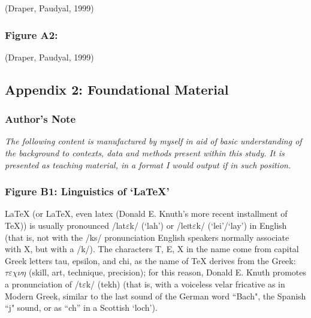 \documentclass[11pt, english]{article}
\begin{document}
			\begin{center}
			\end{center}

			(Draper, Paudyal, 1999)

		\subsubsection*{Figure A2:}

			\begin{center}
                        \end{center}

			(Draper, Paudyal, 1999)


	\subsection*{Appendix 2: Foundational Material}

		\subsubsection*{Author's Note}

			\textit{The following content is manufactured by myself in aid of basic understanding of the background to contexts, data and methods present within this study. It is presented as teaching material, in a format I would output if in such position.}
		\subsubsection*{Figure B1: Linguistics of `{\LaTeX}'}

		{\LaTeX} (or LaTeX, even latex (Donald E. Knuth's more recent installment of {\TeX})) is usually pronounced /la\textlengthmark t$\varepsilon$k/ (`lah') or /le\textsc{i}t$\varepsilon$k/ (`lei'/`lay') in English (that is, not with the /ks/ pronunciation English speakers normally associate with X, but with a /k/). The characters T, E, X in the name come from capital Greek letters tau, epsilon, and chi, as the name of {\TeX} derives from the Greek: $\tau\varepsilon\chi\nu\eta$ (skill, art, technique, precision); for this reason, Donald E. Knuth promotes a pronunciation of /t$\varepsilon$k/ (tekh) (that is, with a voiceless velar fricative as in Modern Greek, similar to the last sound of the German word ``Bach", the Spanish ``j" sound, or as ``ch'' in a Scottish `loch'). 
\end{document}
